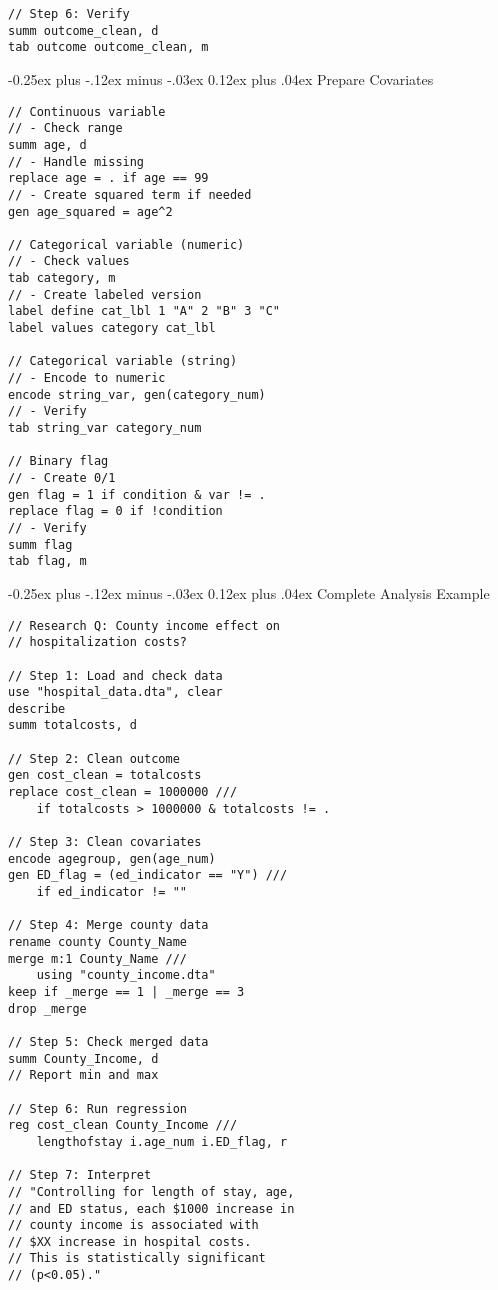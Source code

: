 ﻿\documentclass[8pt,letterpaper]{article}
\makeatletter
\renewcommand{\subsection}{\@startsection{subsection}{2}{0mm}%
                                {-0.25ex plus -.12ex minus -.03ex}%
                                {0.12ex plus .04ex}%
                                {\normalfont\fontsize{8pt}{8pt}\selectfont\bfseries\color{myblue}}}
\makeatother
\begin{document}
\begin{multicols}{2}
\begin{lstlisting}
// Step 6: Verify
summ outcome_clean, d
tab outcome outcome_clean, m
\end{lstlisting}

\subsection{Prepare Covariates}
\begin{lstlisting}
// Continuous variable
// - Check range
summ age, d
// - Handle missing
replace age = . if age == 99
// - Create squared term if needed
gen age_squared = age^2

// Categorical variable (numeric)
// - Check values
tab category, m
// - Create labeled version
label define cat_lbl 1 "A" 2 "B" 3 "C"
label values category cat_lbl

// Categorical variable (string)
// - Encode to numeric
encode string_var, gen(category_num)
// - Verify
tab string_var category_num

// Binary flag
// - Create 0/1
gen flag = 1 if condition & var != .
replace flag = 0 if !condition
// - Verify
summ flag
tab flag, m
\end{lstlisting}

\subsection{Complete Analysis Example}
\begin{lstlisting}
// Research Q: County income effect on
// hospitalization costs?

// Step 1: Load and check data
use "hospital_data.dta", clear
describe
summ totalcosts, d

// Step 2: Clean outcome
gen cost_clean = totalcosts
replace cost_clean = 1000000 ///
    if totalcosts > 1000000 & totalcosts != .

// Step 3: Clean covariates
encode agegroup, gen(age_num)
gen ED_flag = (ed_indicator == "Y") ///
    if ed_indicator != ""

// Step 4: Merge county data
rename county County_Name
merge m:1 County_Name ///
    using "county_income.dta"
keep if _merge == 1 | _merge == 3
drop _merge

// Step 5: Check merged data
summ County_Income, d
// Report min and max

// Step 6: Run regression
reg cost_clean County_Income ///
    lengthofstay i.age_num i.ED_flag, r

// Step 7: Interpret
// "Controlling for length of stay, age,
// and ED status, each $1000 increase in
// county income is associated with
// $XX increase in hospital costs.
// This is statistically significant
// (p<0.05)."
\end{lstlisting}


\end{multicols}
\end{document}
